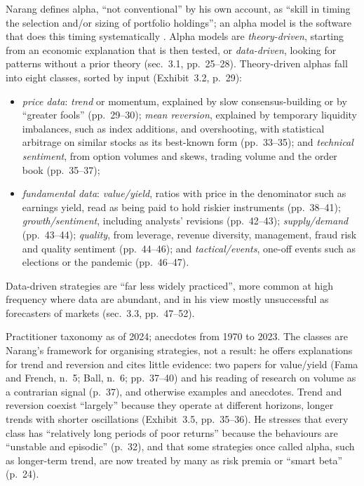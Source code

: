 \begin{qfdefinition}\label{def:alpha-model-taxonomy}
 Narang defines alpha, ``not conventional'' by his own account, as ``skill in timing the selection and/or sizing of portfolio holdings''; an alpha model is the software that does this timing systematically \citep[chap.~3, ``Alpha Models: How Quants Make Money'', pp.~23--24]{s7-narang}. Alpha models are \emph{theory-driven}, starting from an economic explanation that is then tested, or \emph{data-driven}, looking for patterns without a prior theory (sec.~3.1, pp.~25--28). Theory-driven alphas fall into eight classes, sorted by input (Exhibit~3.2, p.~29):
\begin{itemize}
\item \emph{price data}: \emph{trend} or momentum, explained by slow consensus-building or by ``greater fools'' (pp.~29--30); \emph{mean reversion}, explained by temporary liquidity imbalances, such as index additions, and overshooting, with statistical arbitrage on similar stocks as its best-known form (pp.~33--35); and \emph{technical sentiment}, from option volumes and skews, trading volume and the order book (pp.~35--37);
\item \emph{fundamental data}: \emph{value/yield}, ratios with price in the denominator such as earnings yield, read as being paid to hold riskier instruments (pp.~38--41); \emph{growth/sentiment}, including analysts' revisions (pp.~42--43); \emph{supply/demand} (pp.~43--44); \emph{quality}, from leverage, revenue diversity, management, fraud risk and quality sentiment (pp.~44--46); and \emph{tactical/events}, one-off events such as elections or the pandemic (pp.~46--47).
\end{itemize}
Data-driven strategies are ``far less widely practiced'', more common at high frequency where data are abundant, and in his view mostly unsuccessful as forecasters of markets (sec.~3.3, pp.~47--52).

 Practitioner taxonomy as of 2024; anecdotes from 1970 to 2023. The classes are Narang's framework for organising strategies, not a result: he offers explanations for trend and reversion and cites little evidence: two papers for value/yield (Fama and French, n.~5; Ball, n.~6; pp.~37--40) and his reading of research on volume as a contrarian signal (p.~37), and otherwise examples and anecdotes. Trend and reversion coexist ``largely'' because they operate at different horizons, longer trends with shorter oscillations (Exhibit~3.5, pp.~35--36). He stresses that every class has ``relatively long periods of poor returns'' because the behaviours are ``unstable and episodic'' (p.~32), and that some strategies once called alpha, such as longer-term trend, are now treated by many as risk premia or ``smart beta'' (p.~24).


\end{qfdefinition}
